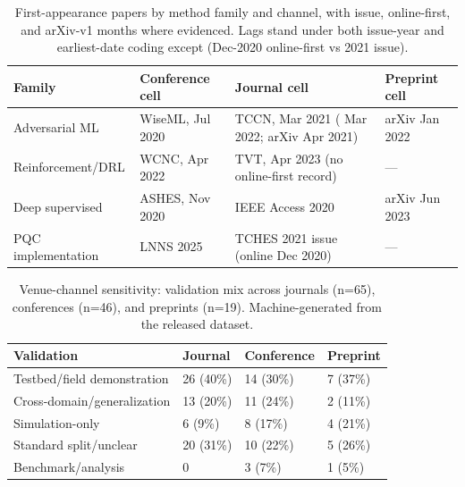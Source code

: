 \documentclass[10.5pt,compsoc,winfonts]{ICN}
\newcommand{\upcite}[1]{\cite{#1}}
\begin{document}
\begin{table}[tbp]
\centering
\footnotesize
\caption{First-appearance papers by method family and channel, with issue, online-first, and arXiv-v1 months where evidenced. Lags stand under both issue-year and earliest-date coding except \upcite{P05} (Dec-2020 online-first vs 2021 issue).}
\label{tab:firstappear}
\begin{tabular}{@{}l l p{4.6cm} l@{}}
\toprule
Family & Conference cell & Journal cell & Preprint cell \\
\midrule
Adversarial ML & \upcite{T39} WiseML, Jul 2020 & \upcite{T09} TCCN, Mar 2021 (\upcite{D36} Mar 2022; arXiv Apr 2021) & \upcite{T47} arXiv Jan 2022 \\
Reinforcement/DRL & \upcite{D34} WCNC, Apr 2022 & \upcite{D22} TVT, Apr 2023 (no online-first record) & — \\
Deep supervised & \upcite{T01} ASHES, Nov 2020 & \upcite{D81} IEEE Access 2020 & \upcite{D63} arXiv Jun 2023 \\
PQC implementation & \upcite{P10} LNNS 2025 & \upcite{P05} TCHES 2021 issue (online Dec 2020) & — \\
\bottomrule
\end{tabular}
\end{table}

\begin{table}[tbp]
\footnotesize
\centering
\caption{Venue-channel sensitivity: validation mix across journals (n=65), conferences (n=46), and preprints (n=19). Machine-generated from the released dataset.}
\label{tab:sensitivity}
\begin{tabular}{llll}
\toprule
Validation & Journal & Conference & Preprint \\
\midrule
Testbed/field demonstration & 26 (40\%) & 14 (30\%) & 7 (37\%) \\
Cross-domain/generalization & 13 (20\%) & 11 (24\%) & 2 (11\%) \\
Simulation-only & 6 (9\%) & 8 (17\%) & 4 (21\%) \\
Standard split/unclear & 20 (31\%) & 10 (22\%) & 5 (26\%) \\
Benchmark/analysis & 0 & 3 (7\%) & 1 (5\%) \\
\bottomrule
\end{tabular}
\end{table}
\end{document}
